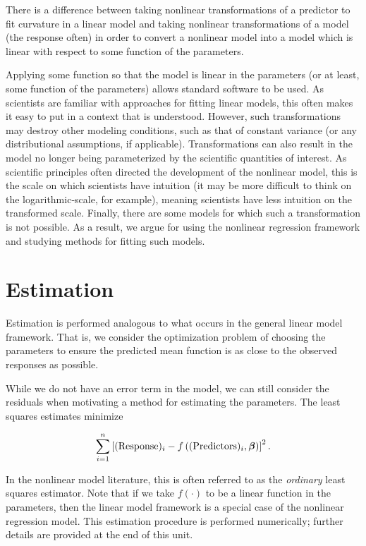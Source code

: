\documentclass[
]{book}
\theoremstyle{plain}
\theoremstyle{mydefn}
\theoremstyle{myexmpl}
\theoremstyle{remark}
\begin{document}
\begin{rmdwarning}
There is a difference between taking nonlinear transformations of a predictor to fit curvature in a linear model and taking nonlinear transformations of a model (the response often) in order to convert a nonlinear model into a model which is linear with respect to some function of the parameters.
\end{rmdwarning}

Applying some function so that the model is linear in the parameters (or at least, some function of the parameters) allows standard software to be used. As scientists are familiar with approaches for fitting linear models, this often makes it easy to put in a context that is understood. However, such transformations may destroy other modeling conditions, such as that of constant variance (or any distributional assumptions, if applicable). Transformations can also result in the model no longer being parameterized by the scientific quantities of interest. As scientific principles often directed the development of the nonlinear model, this is the scale on which scientists have intuition (it may be more difficult to think on the logarithmic-scale, for example), meaning scientists have less intuition on the transformed scale. Finally, there are some models for which such a transformation is not possible. As a result, we argue for using the nonlinear regression framework and studying methods for fitting such models.

\hypertarget{estimation}{%
\section{Estimation}\label{estimation}}

Estimation is performed analogous to what occurs in the general linear model framework. That is, we consider the optimization problem of choosing the parameters to ensure the predicted mean function is as close to the observed responses as possible.

While we do not have an error term in the model, we can still consider the residuals when motivating a method for estimating the parameters. The least squares estimates minimize

\[\sum\limits_{i=1}^{n} \left[(\text{Response})_i - f\left((\text{Predictors})_i, \boldsymbol{\beta}\right)\right]^2.\]

In the nonlinear model literature, this is often referred to as the \emph{ordinary} least squares estimator. Note that if we take \(f(\cdot)\) to be a linear function in the parameters, then the linear model framework is a special case of the nonlinear regression model. This estimation procedure is performed numerically; further details are provided at the end of this unit.
\end{document}
